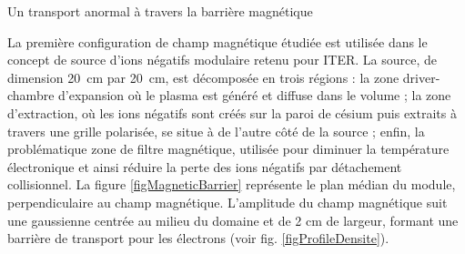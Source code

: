 \documentclass[a4paper,11pt]{article} %
\begin{document}
\begin{section}{Un transport anormal à travers la barrière magnétique}
\begin{figure}
\capbeside
\begin{floatrow}[2]
	\hfill
\end{floatrow}
\end{figure}
La première configuration de champ magnétique étudiée est utilisée dans le concept de source d'ions négatifs modulaire 
retenu pour ITER. La source, de dimension 20~cm par 20~cm, est décomposée en trois régions : la zone driver-chambre 
d'expansion où le plasma est généré et diffuse dans le volume ; la zone d'extraction, où les ions négatifs sont créés sur
la paroi de césium puis extraits à travers une grille polarisée, se situe à de l'autre côté de la source ; enfin, 
la problématique zone de filtre magnétique, utilisée pour diminuer la température électronique et ainsi réduire la 
perte des ions négatifs par détachement collisionnel. La figure \ref{figMagneticBarrier} représente le plan médian du module, 
perpendiculaire au champ magnétique. L'amplitude du champ magnétique suit une gaussienne centrée au milieu du domaine et de 
2 cm de largeur, formant une barrière de transport pour les électrons (voir fig. \ref{figProfileDensite}). 

\end{section}
\end{document}
